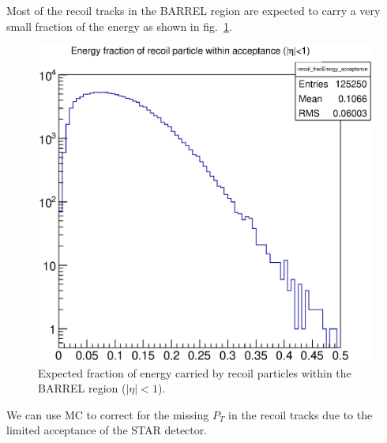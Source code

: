 \documentclass[12pt]{article}
\begin{document}
Most of the recoil tracks in the BARREL region are expected to carry a very
small fraction of the energy as shown in fig.~\ref{fig:MC_recoil_Efrac}.

\begin{figure}[htbp]
\centering
\includegraphics[height=0.25\textheight]{images/recoil_energy_frac.eps}
\caption{Expected fraction of energy carried by recoil particles within the BARREL region ($|\eta|<1$).}
\label{fig:MC_recoil_Efrac} 
\end{figure}

We can use MC to correct for the missing $P_{T}$ in the recoil tracks due to
the limited acceptance of the STAR detector. 


\end{document}
